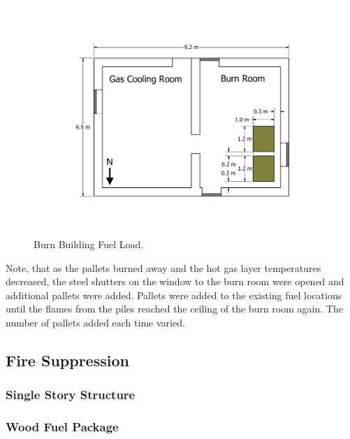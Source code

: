 \documentclass[12pt,oneside]{book}
\begin{document}
\begin{figure}[!ht]
	\includegraphics[width=\columnwidth]{../Figures/Floor_Plans/PDFs/West_Structure/DelCo_2012_West_Structure_Pallets}
	\caption{Burn Building Fuel Load.}
	\label{fig:Burn_Building_Fuel_Load}
\end{figure}

Note, that as the pallets burned away and the hot gas layer temperatures decreased, the steel shutters on the window to the burn room were opened and additional pallets were added. Pallets were added to the existing fuel locations until the flames from the piles reached the ceiling of the burn room again. The number of pallets added each time varied.

\clearpage

\subsection{Fire Suppression}
\label{sec:Fuel_Load_Fire_Suppression}

\subsubsection*{Single Story Structure}
\label{sec:suppresion_single}

\subsubsection{Wood Fuel Package}
\label{sec:fire_suppression_pallet_fuel}
\end{document}
